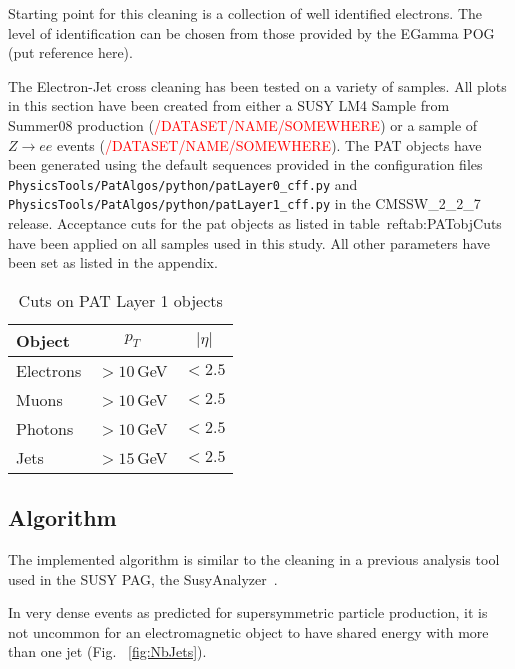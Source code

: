 \documentclass{cmspaper}
\begin{document}
Starting point for this cleaning is a collection of well identified electrons.
The level of identification can be chosen from those provided by the EGamma POG
{\color{red}(put reference here)}.

The Electron-Jet cross cleaning has been tested on a variety of samples. All
plots in this section have been created from either a SUSY LM4 Sample from
Summer08 production (\textcolor{red}{/DATASET/NAME/SOMEWHERE}) or a sample of
$Z\rightarrow ee$ events (\textcolor{red}{/DATASET/NAME/SOMEWHERE}). The PAT
objects have been generated using the default sequences provided in the
configuration files
\texttt{PhysicsTools/PatAlgos/python/patLayer0\_cff.py} and
\texttt{PhysicsTools/PatAlgos/python/patLayer1\_cff.py} in the CMSSW\_2\_2\_7
release. Acceptance cuts for the pat objects as listed in
table~ref{tab:PATobjCuts} have been applied on all samples used in this study.
All other parameters have been set as listed in the appendix.

\begin{table}[h]
\caption{Cuts on PAT Layer 1 objects}
\begin{center}
\begin{tabular}{l|c|c}
\textbf{Object} & \textbf{$p_T$} & \textbf{$|\eta|$} \\ \hline
    Electrons & $>10$\,GeV & $<2.5$  \\\hline
    Muons     & $>10$\,GeV & $<2.5$  \\\hline
    Photons   & $>10$\,GeV & $<2.5$  \\\hline
    Jets      & $>15$\,GeV & $<2.5$
\end{tabular}
\end{center}
\label{tab:PATobjCuts}
\end{table}

\subsection{Algorithm}
The implemented algorithm is similar to the cleaning in a previous analysis
tool used in the SUSY PAG, the SusyAnalyzer~\cite{SusyAnalyzer}.

In very dense events as predicted for supersymmetric particle production, it is
not uncommon for an electromagnetic object to have shared energy with more than one jet (Fig. ~\ref{fig:NbJets}).
\end{document}
